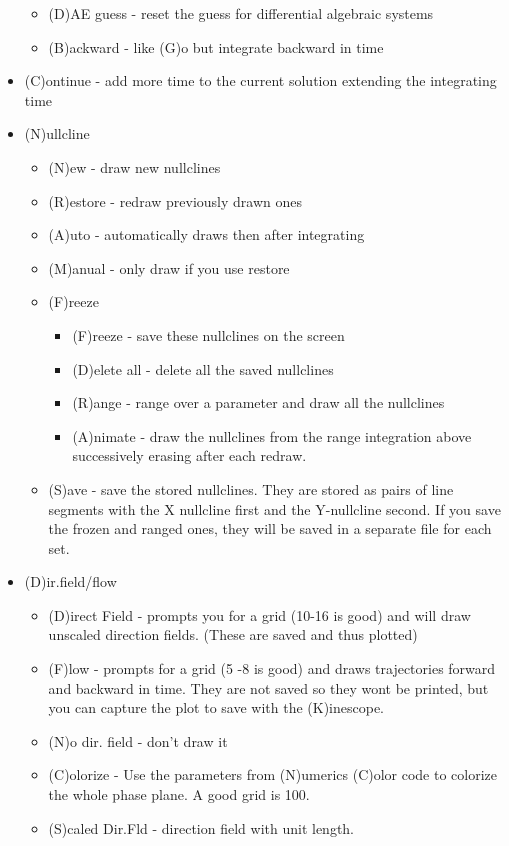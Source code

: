 \documentclass{article}
\begin{document}
\begin{itemize}
\begin{itemize}
\item (D)AE guess - reset the guess for differential algebraic systems 
\item (B)ackward - like (G)o but integrate backward in time
\end{itemize}
\item (C)ontinue - add more time to the current solution extending the integrating time
\item (N)ullcline 
\begin{itemize}
\item (N)ew - draw new nullclines
\item (R)estore - redraw previously drawn ones
\item (A)uto - automatically draws then after integrating
\item (M)anual - only draw if you use restore
\item (F)reeze
\begin{itemize}
\item (F)reeze - save these nullclines on the screen
\item (D)elete all - delete all the saved nullclines
\item (R)ange - range over a parameter and draw all the nullclines
\item (A)nimate - draw the nullclines from the range integration above successively erasing after each redraw.
\end{itemize}
\item (S)ave - save the stored nullclines. They are stored as pairs of line segments with the X nullcline first and the Y-nullcline second. If you save the frozen and ranged ones, they will be saved in a separate file for each set. 
\end{itemize}
\item (D)ir.field/flow 
\begin{itemize}
\item (D)irect Field - prompts you for a grid (10-16 is good) and will draw unscaled direction fields. (These are saved and thus plotted)
\item (F)low - prompts for a grid (5 -8 is good) and draws trajectories forward and backward in time. They are not saved so they wont be printed, but you can capture the plot to save with the (K)inescope.
\item (N)o dir. field - don't draw it
\item (C)olorize - Use the parameters from (N)umerics (C)olor code to colorize the whole phase plane. A good grid is 100.
\item (S)caled Dir.Fld - direction field with unit length.

\end{itemize}
\end{itemize}
\end{document}
